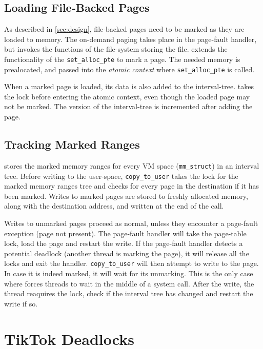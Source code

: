 \subsection{Loading File-Backed Pages}

As described in \autoref{sec:design}, file-backed pages need to be marked as
they are loaded to memory. The on-demand paging takes place in the page-fault
handler, but invokes the functions of the file-system storing the file. \sysname
extends the functionality of the \texttt{set\_alloc\_pte} to mark a page. The
needed memory is prealocated, and passed into the \emph{atomic context} where 
\texttt{set\_alloc\_pte} is called.

When a marked page is loaded, its data is also added to the interval-tree.
\sysname takes the lock before entering the atomic context, even though the
loaded page may not be marked. The version of the interval-tree is incremented
after adding the page.

\subsection{Tracking Marked Ranges}

\sysname stores the marked memory ranges for every VM space (\texttt{mm\_struct})
in an interval tree. Before writing to the user-space, \texttt{copy\_to\_user}
takes the lock for the marked memory ranges tree and checks for every page in the
destination if it has been marked. Writes to marked pages are stored to freshly
allocated memory, along with the destination address, and written at the end of 
the call.

Writes to unmarked pages proceed as normal, unless they encounter a page-fault
exception (page not present). The page-fault handler will take the page-table
lock, load the page and restart the write. If the page-fault handler detects a
potential deadlock (another thread is marking the page), it will release all the
locks and exit the handler. \texttt{copy\_to\_user} will then attempt to write 
to the page. In case it is indeed marked, it will wait for its unmarking. This
is the only case where \sysname forces threads to wait in the middle of a
system call. After the write, the thread reaquires the lock, check if the interval
tree has changed and restart the write if so.

\section{TikTok Deadlocks}
\label{sec:deadlocks}

